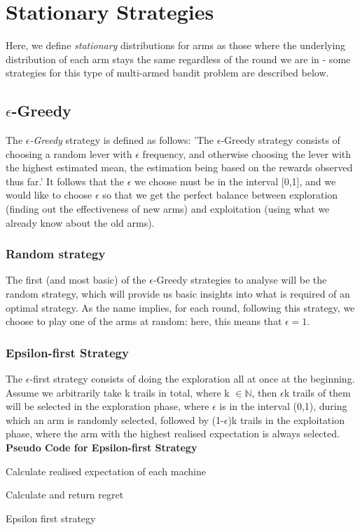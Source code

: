 \section{Stationary Strategies}
Here, we define \emph{stationary} distributions for arms as those where the underlying distribution of each arm stays the same regardless of the round we are in - some strategies for this type of multi-armed bandit problem are described below.
  
\subsection{$\epsilon$-Greedy}
The \emph{$\epsilon$-Greedy} strategy is defined as follows: 'The $\epsilon$-Greedy strategy consists of choosing a random lever with $\epsilon$ frequency, and otherwise choosing the lever with the highest estimated mean, the estimation being based on the rewards observed thus far.' \citep{vermorel} It follows that the $\epsilon$ we choose must be in the interval [0,1], and we would like to choose $\epsilon$ so that we get the perfect balance between exploration (finding out the effectiveness of new arms) and exploitation (using what we already know about the old arms).

\subsubsection{Random strategy}
The first (and most basic) of the $\epsilon$-Greedy strategies to analyse will be the random strategy, which will provide us basic insights into what is required of an optimal strategy. As the name implies, for each round, following this strategy, we choose to play one of the arms at random: here, this means that $\epsilon = 1$.

\subsubsection{Epsilon-first Strategy}

The $\epsilon$-first strategy consists of doing the exploration all at once at the beginning. Assume we arbitrarily take k trails in total, where k $\in \mathbb{N}$, then $\epsilon$k trails of them will be selected in the exploration phase, where $\epsilon$ is in the interval (0,1), during which an arm is randomly selected, followed by (1-$\epsilon$)k trails in the exploitation phase, where the arm with the highest realised expectation is always selected.
\newline
\textbf{Pseudo Code for Epsilon-first Strategy}
\newline
	\begin{algorithm}[H]
 Calculate realised expectation of each machine\;
 
 Calculate and return regret
 \caption{Epsilon first strategy}
\end{algorithm}


